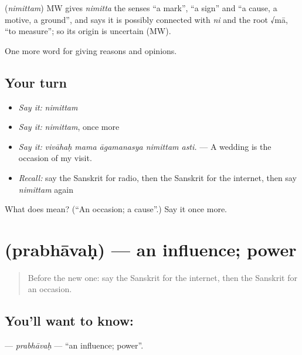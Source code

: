 \begin{cousinweb}
\textbf{} (\emph{nimittam}) MW gives \emph{nimitta} the senses \textquotedblleft{}a mark\textquotedblright{}, \textquotedblleft{}a sign\textquotedblright{} and \textquotedblleft{}a cause, a motive, a ground\textquotedblright{}, and says it is possibly connected with \emph{ni} and the root √mā, \textquotedblleft{}to measure\textquotedblright{}; so its origin is uncertain (MW).
\end{cousinweb}

\begin{grammarlens}[title={What you've built}]
One more word for giving reasons and opinions.
\end{grammarlens}

\subsection*{Your turn}
\begin{itemize}
\raggedright
  \item \emph{Say it:} \emph{nimittam}
  \item \emph{Say it:} \emph{nimittam}, once more
  \item \emph{Say it:} \emph{vivāhaḥ mama āgamanasya nimittam asti.} — A wedding is the occasion of my visit.
  \item \emph{Recall:} say the Sanskrit for radio, then the Sanskrit for the internet, then say \emph{nimittam} again
\end{itemize}

\begin{tcolorbox}[breakable,colback=teal!4,colframe=teal!35!black,title={Before you move on}]
What does  mean? (\textquotedblleft{}An occasion; a cause\textquotedblright{}.) Say it once more.
\end{tcolorbox}
\section[\texorpdfstring{\sk{प्रभावः} (prabhāvaḥ)}{प्रभावः (prabhāvaḥ)}]{ (prabhāvaḥ) — an influence; power}

\label{lesson:SA-C340-prabhavah}



\begin{quote}
Before the new one: say the Sanskrit for the internet, then the Sanskrit for an occasion.
\end{quote}

\subsection*{You'll want to know: }
\textbf{} — \emph{prabhāvaḥ} — \textquotedblleft{}an influence; power\textquotedblright{}.

